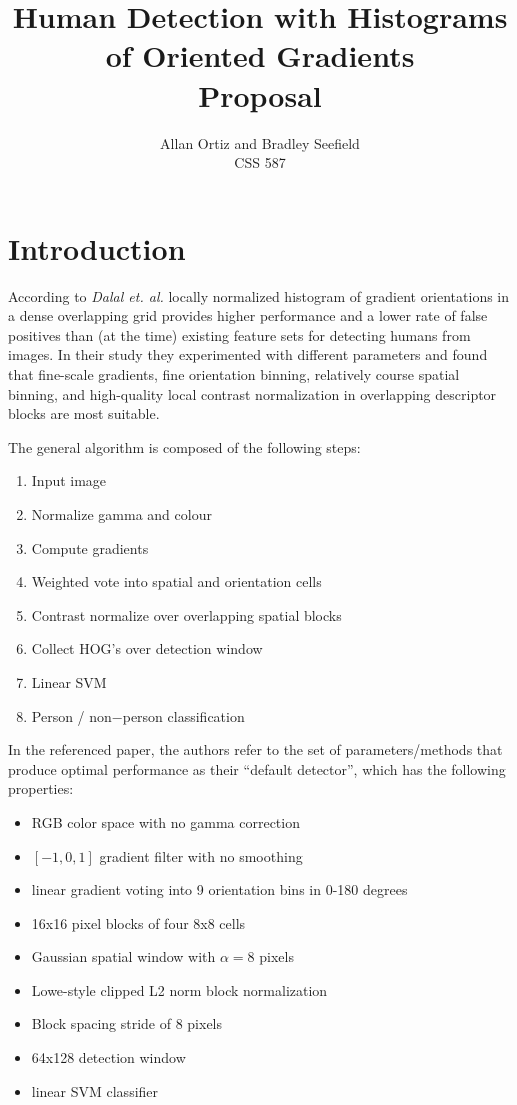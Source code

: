 \documentclass[a4paper,11pt]{article}
\title{Human Detection with Histograms of Oriented Gradients\\
       Proposal}
\author{Allan Ortiz and Bradley Seefield\\
	CSS 587}
\begin{document}
\maketitle

\section{Introduction} %
According to \emph{Dalal et. al.}\cite{dalal05} locally normalized histogram of gradient orientations in 
a dense overlapping grid provides higher performance and a lower rate of false positives than (at the time)
existing feature sets for detecting humans from images. In their study they experimented 
with different parameters and found that fine-scale gradients, fine orientation binning, 
relatively course spatial binning, and high-quality local contrast normalization in 
overlapping descriptor blocks are most suitable.

The general algorithm is composed of the following steps:
\begin{enumerate}
  \item Input image
  \item Normalize gamma and colour 
  \item Compute gradients
  \item Weighted vote into spatial and orientation cells
  \item Contrast normalize over overlapping spatial blocks
  \item Collect HOG’s over detection window
  \item Linear SVM
  \item Person / non−person classification
\end{enumerate}

In the referenced paper, the authors refer to the set of parameters/methods that produce 
optimal performance as their ``default detector'', which has the following properties:
\begin{itemize}
  \item RGB color space with no gamma correction
  \item $[-1, 0, 1]$ gradient filter with no smoothing
  \item linear gradient voting into 9 orientation bins in 0-180 degrees
  \item 16x16 pixel blocks of four 8x8 cells
  \item Gaussian spatial window with $\alpha = 8$ pixels
  \item Lowe-style clipped L2 norm block normalization
  \item Block spacing stride of 8 pixels
  \item 64x128 detection window
  \item linear SVM classifier
\end{itemize}
\end{document}
